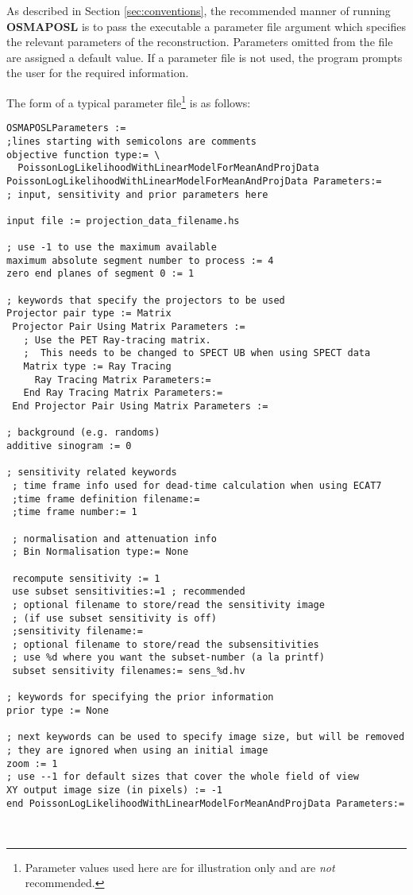 \documentclass{article}
\begin{document}
{As described in Section \ref{sec:conventions}, 
the recommended manner of running \textbf{OSMAPOSL} 
is to pass the executable a parameter file argument which specifies 
the relevant parameters of the reconstruction. Parameters omitted 
from the file are assigned a default value. If a parameter file 
is not used, the program prompts the user for the required information. 



The form of a typical parameter file\footnote{Parameter values used here are for
illustration only and are \textit{not} recommended.} is as follows:

{\small 
\begin{verbatim}
OSMAPOSLParameters :=
;lines starting with semicolons are comments
objective function type:= \
  PoissonLogLikelihoodWithLinearModelForMeanAndProjData
PoissonLogLikelihoodWithLinearModelForMeanAndProjData Parameters:=
; input, sensitivity and prior parameters here

input file := projection_data_filename.hs

; use -1 to use the maximum available
maximum absolute segment number to process := 4
zero end planes of segment 0 := 1

; keywords that specify the projectors to be used
Projector pair type := Matrix 
 Projector Pair Using Matrix Parameters := 
   ; Use the PET Ray-tracing matrix.
   ;  This needs to be changed to SPECT UB when using SPECT data
   Matrix type := Ray Tracing
     Ray Tracing Matrix Parameters:=
   End Ray Tracing Matrix Parameters:= 
 End Projector Pair Using Matrix Parameters :=

; background (e.g. randoms)
additive sinogram := 0

; sensitivity related keywords
 ; time frame info used for dead-time calculation when using ECAT7
 ;time frame definition filename:=
 ;time frame number:= 1

 ; normalisation and attenuation info
 ; Bin Normalisation type:= None
 
 recompute sensitivity := 1
 use subset sensitivities:=1 ; recommended 
 ; optional filename to store/read the sensitivity image 
 ; (if use subset sensitivity is off)
 ;sensitivity filename:=
 ; optional filename to store/read the subsensitivities
 ; use %d where you want the subset-number (a la printf)
 subset sensitivity filenames:= sens_%d.hv

; keywords for specifying the prior information
prior type := None

; next keywords can be used to specify image size, but will be removed
; they are ignored when using an initial image
zoom := 1
; use --1 for default sizes that cover the whole field of view
XY output image size (in pixels) := -1
end PoissonLogLikelihoodWithLinearModelForMeanAndProjData Parameters:=



\end{verbatim}}}
\end{document}
